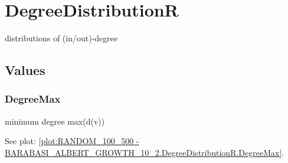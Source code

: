 %
%
\section{DegreeDistributionR}
distributions of (in/out)-degree

\subsection{Values}
\subsubsection{DegreeMax}
minimum degree max(d(v))

See plot: \ref{plot:RANDOM_100_500 - BARABASI_ALBERT_GROWTH_10_2.DegreeDistributionR.DegreeMax}.

%
%
